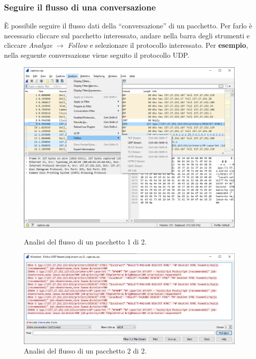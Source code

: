 \documentclass[a4paper]{article}
\newcommand{\dquotes}[1]{``#1''}
\begin{document}
	\subsubsection{Seguire il flusso di una conversazione}
	
	È possibile seguire il flusso dati della \dquotes{conversazione} di un pacchetto. Per farlo è necessario cliccare sul pacchetto interessato, andare nella barra degli strumenti e cliccare \emph{Analyze} $\rightarrow$ \emph{Follow} e selezionare il protocollo interessato. Per \textcolor{Green4}{\textbf{esempio}}, nella seguente conversazione viene seguito il protocollo UDP.
	
	\begin{figure}[!htp]
		\centering
		\includegraphics[width=\textwidth]{img/wireshark/grafica-wireshark-5.png}
		\caption{Analisi del flusso di un pacchetto 1 di 2.}
		\vspace{2em}
		\includegraphics[width=\textwidth]{img/wireshark/grafica-wireshark-6.png}
		\caption{Analisi del flusso di un pacchetto 2 di 2.}
	\end{figure}\newpage
\end{document}
